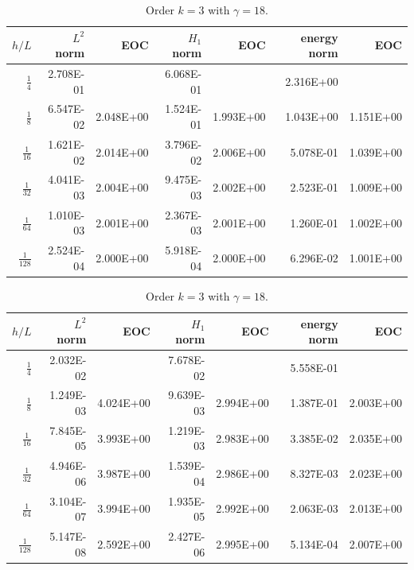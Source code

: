 \begin{table}
  \caption{\label{tab:ex2_order2} Order $k=2$ with $ \gamma = 9$}
  \begin{tabular}{rrrrrrr}
    \hline\hline
    \textbf{$h/{L} $} & \textbf{$L^2$ norm} & \textbf{EOC} & \textbf{$H_1$ norm} & \textbf{EOC} & \textbf{energy norm} & \textbf{EOC} \\\hline
    $\frac{1}{4}$ & 2.708E-01 &  & 6.068E-01 &  & 2.316E+00 &  \\
    $\frac{1}{8}$ & 6.547E-02 & 2.048E+00 & 1.524E-01 & 1.993E+00 & 1.043E+00 & 1.151E+00 \\
    $\frac{1}{16}$ & 1.621E-02 & 2.014E+00 & 3.796E-02 & 2.006E+00 & 5.078E-01 & 1.039E+00 \\
    $\frac{1}{32}$ & 4.041E-03 & 2.004E+00 & 9.475E-03 & 2.002E+00 & 2.523E-01 & 1.009E+00 \\
    $\frac{1}{64}$ & 1.010E-03 & 2.001E+00 & 2.367E-03 & 2.001E+00 & 1.260E-01 & 1.002E+00 \\
    $\frac{1}{128}$ & 2.524E-04 & 2.000E+00 & 5.918E-04 & 2.000E+00 & 6.296E-02 & 1.001E+00 \\\hline\hline
  \end{tabular}

  \caption{\label{tab:ex2_order3} Order $k=3$ with $ \gamma = 18$.}
  \begin{tabular}{rrrrrrr}
    \hline\hline
    \textbf{$h/{L} $} & \textbf{$L^2$ norm} & \textbf{EOC} & \textbf{$H_1$ norm} & \textbf{EOC} & \textbf{energy norm} & \textbf{EOC} \\\hline
    $\frac{1}{4}$ & 2.032E-02 &  & 7.678E-02 &  & 5.558E-01 &  \\
    $\frac{1}{8}$ & 1.249E-03 & 4.024E+00 & 9.639E-03 & 2.994E+00 & 1.387E-01 & 2.003E+00 \\
    $\frac{1}{16}$ & 7.845E-05 & 3.993E+00 & 1.219E-03 & 2.983E+00 & 3.385E-02 & 2.035E+00 \\
    $\frac{1}{32}$ & 4.946E-06 & 3.987E+00 & 1.539E-04 & 2.986E+00 & 8.327E-03 & 2.023E+00 \\
    $\frac{1}{64}$ & 3.104E-07 & 3.994E+00 & 1.935E-05 & 2.992E+00 & 2.063E-03 & 2.013E+00 \\
    $\frac{1}{128}$ & 5.147E-08 & 2.592E+00 & 2.427E-06 & 2.995E+00 & 5.134E-04 & 2.007E+00 \\\hline\hline
  \end{tabular}


\end{table}

